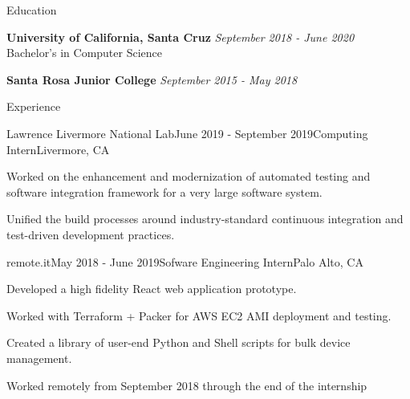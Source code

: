 \documentclass{resume} %
\begin{document}

\begin{rSection}{Education}

    {\bf University of California, Santa Cruz} \hfill {\em September 2018 - June 2020} \\ 
    Bachelor's in Computer Science

    {\bf Santa Rosa Junior College} \hfill {\em September 2015 - May 2018}

\end{rSection}


\begin{rSection}{Experience}

    \begin{rSubsection}{Lawrence Livermore National Lab}{June 2019 - September 2019}{Computing Intern}{Livermore, CA}
        \item Worked on the enhancement and modernization of automated testing and software integration framework for a very large software system.
        \item Unified the build processes around industry-standard continuous integration and test-driven development practices.
    \end{rSubsection}

    \begin{rSubsection}{remote.it}{May 2018 - June 2019}{Sofware Engineering Intern}{Palo Alto, CA}
        \item Developed a high fidelity React web application prototype.
        \item Worked with Terraform + Packer for AWS EC2 AMI deployment and testing.
        \item Created a library of user-end Python and Shell scripts for bulk device management.
        \item Worked remotely from September 2018 through the end of the internship
    \end{rSubsection}

\end{rSection}

\end{document}
